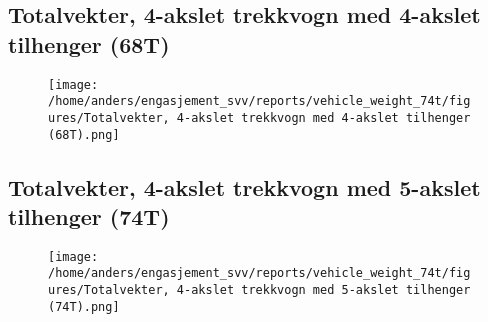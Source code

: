 \documentclass{article}
\begin{document}
\subsection{Totalvekter, 4-akslet trekkvogn med 4-akslet tilhenger (68T)}
\begin{figure}[H]
\centering
\texttt{[image: /home/anders/engasjement\_svv/reports/vehicle\_weight\_74t/figures/Totalvekter, 4-akslet trekkvogn med 4-akslet tilhenger (68T).png]}
\end{figure}
\subsection{Totalvekter, 4-akslet trekkvogn med 5-akslet tilhenger (74T)}
\begin{figure}[H]
\centering
\texttt{[image: /home/anders/engasjement\_svv/reports/vehicle\_weight\_74t/figures/Totalvekter, 4-akslet trekkvogn med 5-akslet tilhenger (74T).png]}
\end{figure}
\end{document}
